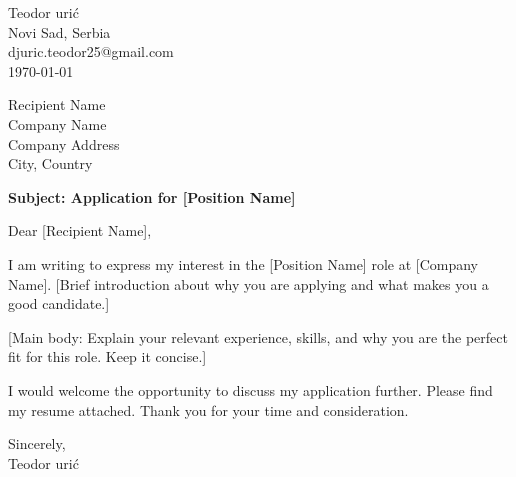 \documentclass[a4paper,11pt]{article}
\begin{document}
\begin{flushright}
    Teodor \DJ{}urić\\
    Novi Sad, Serbia\\
    djuric.teodor25@gmail.com\\
    \today
\end{flushright}

\vspace{1cm}

Recipient Name\\
Company Name\\
Company Address\\
City, Country

\vspace{1cm}

\textbf{Subject: Application for [Position Name]}

\vspace{1cm}

Dear [Recipient Name],

I am writing to express my interest in the [Position Name] role at [Company Name]. [Brief introduction about why you are applying and what makes you a good candidate.]

[Main body: Explain your relevant experience, skills, and why you are the perfect fit for this role. Keep it concise.]

I would welcome the opportunity to discuss my application further. Please find my resume attached. Thank you for your time and consideration.

Sincerely,\\
Teodor \DJ{}urić
\end{document}
